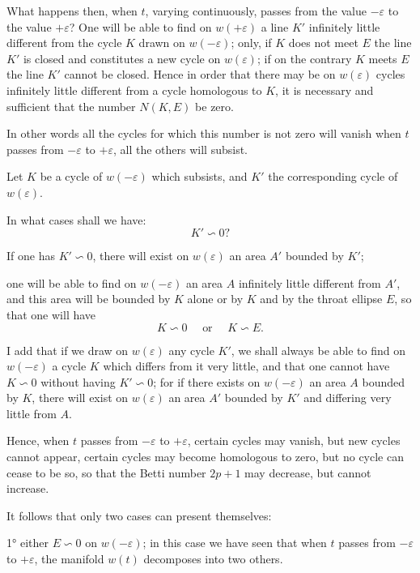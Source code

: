 \documentclass{article}
\begin{document}
What happens then, when $t$, varying continuously, passes from the value $-\varepsilon$ to the value $+\varepsilon$? One will be able to find on $w(+\varepsilon)$ a line $K'$ infinitely little different from the cycle $K$ drawn on $w(-\varepsilon)$; only, if $K$ does not meet $E$ the line $K'$ is closed and constitutes a new cycle on $w(\varepsilon)$; if on the contrary $K$ meets $E$ the line $K'$ cannot be closed. Hence in order that there may be on $w(\varepsilon)$ cycles infinitely little different from a cycle homologous to $K$, it is necessary and sufficient that the number $N(K, E)$ be zero.

In other words all the cycles for which this number is not zero will vanish when $t$ passes from $-\varepsilon$ to $+\varepsilon$, all the others will subsist.

Let $K$ be a cycle of $w(-\varepsilon)$ which subsists, and $K'$ the corresponding cycle of $w(\varepsilon)$.

In what cases shall we have:
\[ K' \backsim 0? \]

If one has $K' \backsim 0$, there will exist on $w(\varepsilon)$ an area $A'$ bounded by $K'$;

one will be able to find on $w(-\varepsilon)$ an area $A$ infinitely little different from $A'$, and this area will be bounded by $K$ alone or by $K$ and by the throat ellipse $E$, so that one will have
\[ K \backsim 0 \quad \text{ or } \quad K \backsim E. \]

I add that if we draw on $w(\varepsilon)$ any cycle $K'$, we shall always be able to find on $w(-\varepsilon)$ a cycle $K$ which differs from it very little, and that one cannot have $K \backsim 0$ without having $K' \backsim 0$; for if there exists on $w(-\varepsilon)$ an area $A$ bounded by $K$, there will exist on $w(\varepsilon)$ an area $A'$ bounded by $K'$ and differing very little from $A$.

Hence, when $t$ passes from $-\varepsilon$ to $+\varepsilon$, certain cycles may vanish, but new cycles cannot appear, certain cycles may become homologous to zero, but no cycle can cease to be so, so that the Betti number $2p + 1$ may decrease, but cannot increase.

It follows that only two cases can present themselves:

1° either $E \backsim 0$ on $w(-\varepsilon)$; in this case we have seen that when $t$ passes from $-\varepsilon$ to $+\varepsilon$, the manifold $w(t)$ decomposes into two others.
\end{document}
